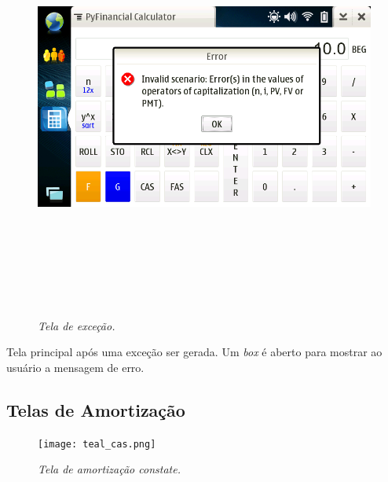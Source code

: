 \begin{figure}[!h]
 \includegraphics[height = 14cm]{tela_error.png}
 \caption{\it Tela de exceção.} \label{tab:tela_error}
\end{figure}

Tela principal após uma exceção ser gerada. Um \textit{box} é aberto para mostrar ao usuário a
mensagem de erro.


\subsection{Telas de Amortização}

\begin{figure}[!h]
 \texttt{[image: teal\_cas.png]}
 \caption{\it Tela de amortização constate.} \label{tab:tela_cas}
\end{figure}

